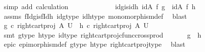 \begin{isabellebody}
\ {\isacharparenleft}{\kern0pt}simp\ add{\isacharcolon}{\kern0pt}\ calculation{\isacharparenright}{\kern0pt}\ \ \ \isanewline
\ \ \ \isamarkupfalse%
\isanewline
\ \ \ \isamarkupfalse%
\ \isamarkupfalse%
\ idg{\isacharunderscore}{\kern0pt}is{\isacharunderscore}{\kern0pt}idh{\isacharcolon}{\kern0pt}\ {\isachardoublequoteopen}{\isacharparenleft}{\kern0pt}id{\isacharparenleft}{\kern0pt}A{\isacharparenright}{\kern0pt}\ {\isasymtimes}\isactrlsub f\ g{\isacharparenright}{\kern0pt}\ {\isacharequal}{\kern0pt}\ {\isacharparenleft}{\kern0pt}id{\isacharparenleft}{\kern0pt}A{\isacharparenright}{\kern0pt}\ {\isasymtimes}\isactrlsub f\ h{\isacharparenright}{\kern0pt}{\isachardoublequoteclose}\isanewline
\ \ \ \ \isamarkupfalse%
\ assms\ fIdg{\isacharunderscore}{\kern0pt}is{\isacharunderscore}{\kern0pt}fIdh\ idg{\isacharunderscore}{\kern0pt}type\ idh{\isacharunderscore}{\kern0pt}type\ monomorphism{\isacharunderscore}{\kern0pt}def{}\ \isamarkupfalse%
\ blast\isanewline
\ \ \ \isamarkupfalse%
\ \isamarkupfalse%
\ {\isachardoublequoteopen}g\ {\isasymcirc}\isactrlsub c\ {\isacharparenleft}{\kern0pt}right{\isacharunderscore}{\kern0pt}cart{\isacharunderscore}{\kern0pt}proj\ A\ U{\isacharparenright}{\kern0pt}\ {\isacharequal}{\kern0pt}\ h\ {\isasymcirc}\isactrlsub c\ {\isacharparenleft}{\kern0pt}right{\isacharunderscore}{\kern0pt}cart{\isacharunderscore}{\kern0pt}proj\ A\ U{\isacharparenright}{\kern0pt}{\isachardoublequoteclose}\isanewline
\ \ \ \ \isamarkupfalse%
\ {\isacharparenleft}{\kern0pt}smt\ g{\isacharunderscore}{\kern0pt}type{}\ h{\isacharunderscore}{\kern0pt}type{}\ id{\isacharunderscore}{\kern0pt}type\ right{\isacharunderscore}{\kern0pt}cart{\isacharunderscore}{\kern0pt}proj{\isacharunderscore}{\kern0pt}cfunc{\isacharunderscore}{\kern0pt}cross{\isacharunderscore}{\kern0pt}prod{\isacharparenright}{\kern0pt}\isanewline
\ \ \ \isamarkupfalse%
\ \isamarkupfalse%
\ {\isachardoublequoteopen}g\ {\isacharequal}{\kern0pt}\ h{\isachardoublequoteclose}\isanewline
\ \ \ \ \isamarkupfalse%
\ epic\ epimorphism{\isacharunderscore}{\kern0pt}def{}\ g{\isacharunderscore}{\kern0pt}type{}\ h{\isacharunderscore}{\kern0pt}type{}\ right{\isacharunderscore}{\kern0pt}cart{\isacharunderscore}{\kern0pt}proj{\isacharunderscore}{\kern0pt}type\ \isamarkupfalse%
\ blast\isanewline
{}\isamarkupfalse%
%
\endisatagproof

\end{isabellebody}
